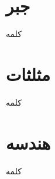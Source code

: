 \section*{جبر}
کلمه
\dotfill
{}
\\
\section*{مثلثات}
کلمه
\dotfill
{}
\\
\section*{هندسه}
کلمه
\dotfill
{}
\\
